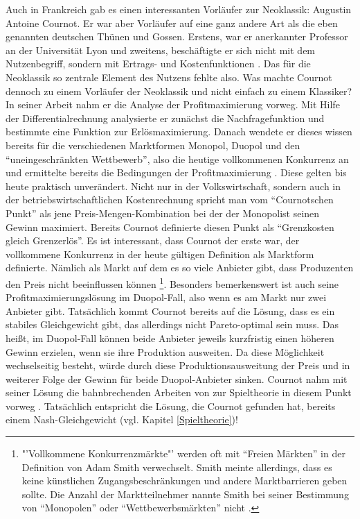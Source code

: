 Auch in Frankreich gab es einen interessanten Vorläufer zur Neoklassik: Augustin Antoine Cournot. Er war aber Vorläufer auf eine ganz andere Art als die eben genannten deutschen Thünen und Gossen. Erstens, war er anerkannter Professor an der Universität Lyon und zweitens, beschäftigte er sich nicht mit dem Nutzenbegriff, sondern mit Ertrags- und Kostenfunktionen \parencite[S. 287f]{Rosner2012}. Das für die Neoklassik so zentrale Element des Nutzens fehlte also. Was machte Cournot dennoch zu einem Vorläufer der Neoklassik und nicht einfach zu einem Klassiker? In seiner Arbeit \textcite{Cournot1838} nahm er die Analyse der Profitmaximierung vorweg. Mit Hilfe der Differentialrechnung analysierte er zunächst die Nachfragefunktion und bestimmte eine Funktion zur Erlösmaximierung. Danach wendete er dieses wissen bereits für die verschiedenen Marktformen Monopol, Duopol und den "`uneingeschränkten Wettbewerb"', also die heutige vollkommenen Konkurrenz an und ermittelte bereits die Bedingungen der Profitmaximierung \parencite[S. 289]{Rosner2012}. Diese gelten bis heute praktisch unverändert.  Nicht nur in der Volkswirtschaft, sondern auch in der betriebswirtschaftlichen Kostenrechnung spricht man vom "`Cournotschen Punkt"' als jene Preis-Mengen-Kombination bei der der Monopolist seinen Gewinn maximiert. Bereits Cournot definierte diesen Punkt als "`Grenzkosten gleich Grenzerlös"'. Es ist interessant, dass Cournot der erste war, der vollkommene Konkurrenz in der heute gültigen Definition als Marktform definierte. Nämlich als Markt auf dem es so viele Anbieter gibt, dass Produzenten den Preis nicht beeinflussen können \footnote{"'Vollkommene Konkurrenzmärkte"' werden oft mit "`Freien Märkten"' in der Definition von Adam Smith verwechselt. Smith meinte allerdings, dass es keine künstlichen Zugangsbeschränkungen und andere Marktbarrieren geben sollte. Die Anzahl der Marktteilnehmer nannte Smith bei seiner Bestimmung von "`Monopolen"' oder "`Wettbewerbsmärkten"' nicht \parencite{Blaug2001}.}. Besonders bemerkenswert ist auch seine Profitmaximierungslösung im Duopol-Fall, also wenn es am Markt nur zwei Anbieter gibt. Tatsächlich kommt Cournot bereits auf die Lösung, dass es ein stabiles Gleichgewicht gibt, das allerdings nicht Pareto-optimal sein muss. Das heißt, im Duopol-Fall können beide Anbieter jeweils kurzfristig einen höheren Gewinn erzielen, wenn sie ihre Produktion ausweiten. Da diese Möglichkeit wechselseitig besteht, würde durch diese Produktionsausweitung der Preis und in weiterer Folge der Gewinn für beide Duopol-Anbieter sinken. Cournot nahm mit seiner Lösung die bahnbrechenden Arbeiten von \textcite{Nash1950} zur Spieltheorie in diesem Punkt vorweg \parencite{Leonard1994}. Tatsächlich entspricht die Lösung, die Cournot gefunden hat, bereits einem Nash-Gleichgewicht (vgl. Kapitel \ref{Spieltheorie})!

